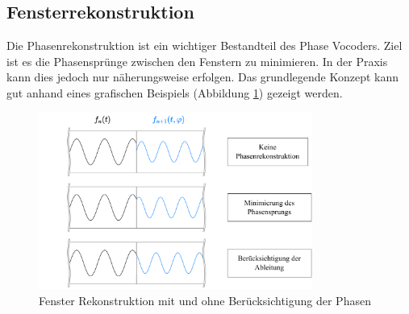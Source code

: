 \subsection{Fensterrekonstruktion
\label{autotune:subsection:fensterRekonstruktion}}
Die Phasenrekonstruktion ist ein wichtiger Bestandteil des Phase Vocoders.
Ziel ist es die Phasensprünge zwischen den Fenstern zu minimieren.
In der Praxis kann dies jedoch nur näherungsweise erfolgen.
Das grundlegende Konzept kann gut anhand eines grafischen Beispiels (Abbildung \ref{autotune:fig:phaseReconstruction}) gezeigt werden.
\begin{figure}
    \centering
    \includegraphics[width=0.8\textwidth]{papers/autotune/images/Fenster-Rekonstruktion.pdf}
    \caption{Fenster Rekonstruktion mit und ohne Berücksichtigung der Phasen}
    \label{autotune:fig:phaseReconstruction}
\end{figure}

